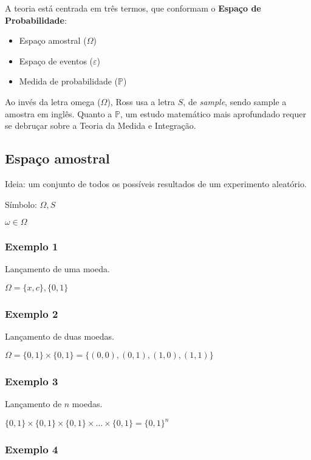 \documentclass{article}
\begin{document}
	A teoria está centrada em três termos, que conformam o \textbf{Espaço de Probabilidade}:
	
	\begin{itemize}
		\item Espaço amostral ($\varOmega$)
		\item Espaço de eventos ($\varepsilon$)
		\item Medida de probabilidade ($\mathbb{P}$)
	\end{itemize}
	
	Ao invés da letra omega ($\varOmega$), Ross\cite{ross2010} usa a letra $S$, de \textit{sample}, sendo sample a amostra em inglês. Quanto a $\mathbb{P}$, um estudo matemático mais aprofundado requer se debruçar sobre a Teoria da Medida e Integração.
	
	\subsection{Espaço amostral}
	
	\noindent Ideia: um conjunto de todos os possíveis resultados de um experimento aleatório.
	
	Símbolo: $\varOmega, S$ 
	
	$\omega \in \varOmega$
	
	\subsubsection{Exemplo 1}
	
	\noindent Lançamento de uma moeda.
	
	$\varOmega = \{x,c\}, \{0,1\} $	
	
	\subsubsection{Exemplo 2}
	
	\noindent Lançamento de duas moedas.
	
	$\varOmega = \{0,1\} \times \{0,1\} = \{(0,0),(0,1),(1,0),(1,1)\} $
	
	\subsubsection{Exemplo 3}
	
	\noindent Lançamento de $n$ moedas.
	
	$ \{0,1\} \times \{0,1\} \times \{0,1\} \times \dots \times \{0,1\} = \{0,1\}^{n} $
	
	\subsubsection{Exemplo 4}
	
\end{document}
